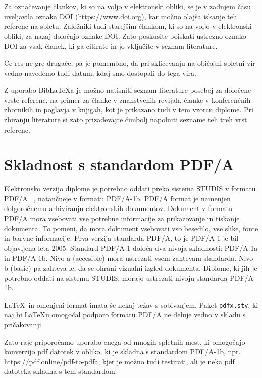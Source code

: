 \documentclass[a4paper,12pt,openright]{book}
\newcommand{\BibLaTeX}{{\sc Bib}\LaTeX}
\begin{document}
Za označevanje člankov, ki so na voljo v elektronski obliki, se je v zadnjem času uveljavila oznaka DOI
(\url{https://www.doi.org}), kar močno olajša iskanje teh referenc na spletu.
Založniki tudi starejšim člankom, ki so na voljo v elektronski obliki, za nazaj določajo oznake DOI.
Zato poskusite poiskati ustrezno oznako DOI za vsak članek, ki ga citirate in jo vključite v seznam literature.

Če res ne gre drugače, pa je pomembno, da pri sklicevanju na običajni spletni vir vedno navedemo tudi datum, kdaj smo dostopali do tega vira.

Z uporabo \BibLaTeX{a} je možno natisniti seznam literature posebej za določene vrste referenc, na primer za članke v znanstvenih revijah, članke v konferenčnih zbornikih in poglavja v knjigah, kot je prikazano tudi v tem vzorcu diplome. Pri zbiranju literature si zato prizadevajte čimbolj napolniti sezname teh treh vrst referenc.


\chapter{Skladnost s standardom PDF/A}
\label{PDF}


Elektronsko verzijo diplome je potrebno oddati preko sistema STUDIS v formatu PDF/A ~\cite{howtopdfa,pdfa},
natančneje v formatu PDF/A-1b. 
PDF/A format je namenjen dolgoročnemu arhiviranju elektronskih dokumentov.
Dokument v formatu PDF/A mora vsebovati vse potrebne informacije za prikazovanje in tiskanje dokumenta. To pomeni, da mora dokument  vsebovati vso besedilo, vse slike, fonte in barvne informacije.
Prva verzija standarda PDF/A, to je PDF/A-1 je bil objavljena leta 2005.
Standard PDF/A-1 določa dva nivoja skladnosti: PDF/A-1a in PDF/A-1b.
Nivo a (accesible) mora ustrezati vsem zahtevam standarda.
Nivo b (basic) pa zahteva le, da se ohrani vizualni izgled dokumenta.
Diplome, ki jih je potrebno oddati na sistemu STUDIS, morajo ustrezati nivoju standarda 
PDF/A-1b.

\LaTeX\ in omenjeni format imata še nekaj težav s sobivanjem. 
Paket \texttt{pdfx.sty}, ki naj bi \LaTeX{u} omogočal podporo formatu PDF/A ne deluje vedno
v skladu s pričakovanji. 

Zato raje priporočamo uporabo enega od mnogih spletnih mest, ki omo\-go\-ča\-jo konverzijo pdf datotek v obliko,
ki je skladna s standardom PDF/A-1b, npr. \url{https://pdf.online/pdf-to-pdfa}, kjer je
možno tudi testirati, ali je neka pdf datoteka skladna s tem standardom.
\end{document}
